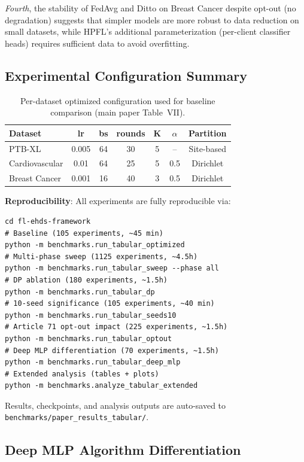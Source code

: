 \documentclass[conference,a4paper]{IEEEtran}
\begin{document}
\textit{Fourth}, the stability of FedAvg and Ditto on Breast Cancer despite opt-out (no degradation) suggests that simpler models are more robust to data reduction on small datasets, while HPFL's additional parameterization (per-client classifier heads) requires sufficient data to avoid overfitting.

\subsection{Experimental Configuration Summary}

\begin{table}[t]
\centering
\caption{Per-dataset optimized configuration used for baseline comparison (main paper Table~VII).}
\label{tab:dataset_config}
\small
\begin{tabular}{lcccccc}
\toprule
\textbf{Dataset} & \textbf{lr} & \textbf{bs} & \textbf{rounds} & \textbf{K} & \textbf{$\alpha$} & \textbf{Partition} \\
\midrule
PTB-XL & 0.005 & 64 & 30 & 5 & -- & Site-based \\
Cardiovascular & 0.01 & 64 & 25 & 5 & 0.5 & Dirichlet \\
Breast Cancer & 0.001 & 16 & 40 & 3 & 0.5 & Dirichlet \\
\bottomrule
\end{tabular}
\end{table}

\textbf{Reproducibility}: All experiments are fully reproducible via:
\begin{verbatim}
cd fl-ehds-framework
# Baseline (105 experiments, ~45 min)
python -m benchmarks.run_tabular_optimized
# Multi-phase sweep (1125 experiments, ~4.5h)
python -m benchmarks.run_tabular_sweep --phase all
# DP ablation (180 experiments, ~1.5h)
python -m benchmarks.run_tabular_dp
# 10-seed significance (105 experiments, ~40 min)
python -m benchmarks.run_tabular_seeds10
# Article 71 opt-out impact (225 experiments, ~1.5h)
python -m benchmarks.run_tabular_optout
# Deep MLP differentiation (70 experiments, ~1.5h)
python -m benchmarks.run_tabular_deep_mlp
# Extended analysis (tables + plots)
python -m benchmarks.analyze_tabular_extended
\end{verbatim}

Results, checkpoints, and analysis outputs are auto-saved to \texttt{benchmarks/paper\_results\_tabular/}.

\subsection{Deep MLP Algorithm Differentiation}
\label{sec:deep_mlp}
\end{document}
